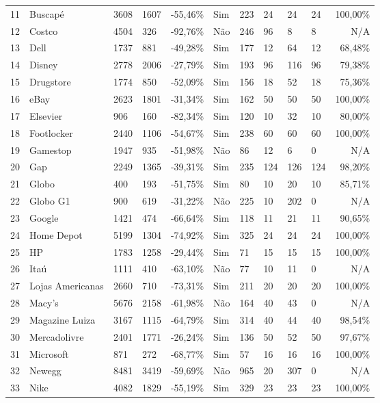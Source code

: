 \documentclass{beamer}
\begin{document}
{\begin{tiny}
\begin{table}[H]
\begin{tabular}{p{1mm}| p{12mm}| p{3mm} p{6mm} p{9mm}| p{6mm}| p{2mm} p{2mm} |
p{2mm} p{2mm} |r}
11 & Buscapé & 3608 & 1607 & -55,46\% & Sim & 223 & 24 & 24 & 24 & 100,00\% \\
12 & Costco & 4504 & 326 & -92,76\% & Não & 246 & 96 & 8 & 8 & N/A \\
13 & Dell & 1737 & 881 & -49,28\% & Sim & 177 & 12 & 64 & 12 & 68,48\% \\
14 & Disney & 2778 & 2006 & -27,79\% & Sim & 193 & 96 & 116 & 96 & 79,38\% \\
15 & Drugstore & 1774 & 850 & -52,09\% & Sim & 156 & 18 & 52 & 18 & 75,36\% \\
16 & eBay & 2623 & 1801 & -31,34\% & Sim & 162 & 50 & 50 & 50 & 100,00\% \\
17 & Elsevier & 906 & 160 & -82,34\% & Sim & 120 & 10 & 32 & 10 & 80,00\% \\
18 & Footlocker & 2440 & 1106 & -54,67\% & Sim & 238 & 60 & 60 & 60 & 100,00\% \\
19 & Gamestop & 1947 & 935 & -51,98\% & Não & 86 & 12 & 6 & 0 & N/A \\
20 & Gap & 2249 & 1365 & -39,31\% & Sim & 235 & 124 & 126 & 124 & 98,20\% \\
21 & Globo & 400 & 193 & -51,75\% & Sim & 80 & 10 & 20 & 10 & 85,71\% \\
22 & Globo G1 & 900 & 619 & -31,22\% & Não & 225 & 10 & 202 & 0 & N/A \\
23 & Google & 1421 & 474 & -66,64\% & Sim & 118 & 11 & 21 & 11 & 90,65\% \\
24 & Home Depot & 5199 & 1304 & -74,92\% & Sim & 325 & 24 & 24 & 24 & 100,00\% \\
25 & HP & 1783 & 1258 & -29,44\% & Sim & 71 & 15 & 15 & 15 & 100,00\% \\
26 & Itaú & 1111 & 410 & -63,10\% & Não & 77 & 10 & 11 & 0 & N/A \\
27 & Lojas Americanas & 2660 & 710 & -73,31\% & Sim & 211 & 20 & 20 & 20 & 100,00\% \\
28 & Macy's & 5676 & 2158 & -61,98\% & Não & 164 & 40 & 43 & 0 & N/A \\
29 & Magazine Luiza & 3167 & 1115 & -64,79\% & Sim & 314 & 40 & 44 & 40 & 98,54\% \\
30 & Mercadolivre & 2401 & 1771 & -26,24\% & Sim & 136 & 50 & 52 & 50 & 97,67\% \\
31 & Microsoft & 871 & 272 & -68,77\% & Sim & 57 & 16 & 16 & 16 & 100,00\% \\
32 & Newegg & 8481 & 3419 & -59,69\% & Não & 965 & 20 & 307 & 0 & N/A \\
33 & Nike & 4082 & 1829 & -55,19\% & Sim & 329 & 23 & 23 & 23 & 100,00\% \\

\end{tabular}
\end{table}
\end{tiny}}
\end{document}
